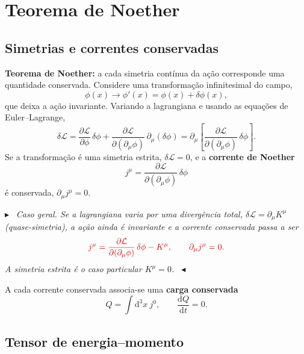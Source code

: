 \documentclass[12pt,a4paper]{article}
\newenvironment{revbox}%
  {\par\medskip\noindent\color{revred}\ensuremath{\blacktriangleright}\ \itshape}%
  {\ \upshape\ensuremath{\blacktriangleleft}\par\medskip}
\newcommand{\dd}{\mathrm{d}}
\newcommand{\pt}[1]{\partial_{#1}}
\newcommand{\Lag}{\mathcal{L}}
\renewcommand{\d}{\partial}
\begin{document}
\section{Teorema de Noether}

\subsection{Simetrias e correntes conservadas}

\textbf{Teorema de Noether:} a cada simetria contínua da ação corresponde
uma quantidade conservada. Considere uma transformação infinitesimal do
campo,
\begin{equation}
  \phi(x)\longrightarrow \phi'(x)=\phi(x)+\delta\phi(x),
\end{equation}
que deixa a ação invariante. Variando a lagrangiana e usando as equações
de Euler--Lagrange,
\begin{equation}
  \delta\Lag
  =\frac{\d\Lag}{\d\phi}\,\delta\phi
   +\frac{\d\Lag}{\d(\pt{\mu}\phi)}\,\pt{\mu}(\delta\phi)
  =\pt{\mu}\!\left[\frac{\d\Lag}{\d(\pt{\mu}\phi)}\,\delta\phi\right].
\end{equation}
Se a transformação é uma simetria estrita, $\delta\Lag=0$, e a
\textbf{corrente de Noether}
\begin{equation}
  j^{\mu}=\frac{\d\Lag}{\d(\pt{\mu}\phi)}\,\delta\phi
\end{equation}
é conservada, $\pt{\mu}j^{\mu}=0$.
\begin{revbox}
Caso geral. Se a lagrangiana varia por uma divergência total,
$\delta\Lag=\pt{\mu}K^{\mu}$ (quase-simetria), a ação ainda é invariante e
a corrente conservada passa a ser
\upshape
\begin{equation}
  \color{revred}
  j^{\mu}=\frac{\d\Lag}{\d(\pt{\mu}\phi)}\,\delta\phi-K^{\mu},
  \qquad \pt{\mu}j^{\mu}=0 .
\end{equation}
\itshape
A simetria estrita é o caso particular $K^{\mu}=0$.
\end{revbox}
A cada corrente conservada associa-se uma \textbf{carga conservada}
\begin{equation}
  Q=\int \dd^{3}x\ j^{0},\qquad \frac{\dd Q}{\dd t}=0 .
\end{equation}

\subsection{Tensor de energia--momento}
\end{document}
